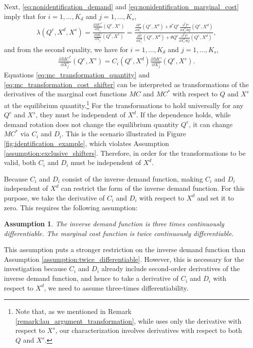 \documentclass[11pt, a4paper]{article}
\newtheorem{assumption}{Assumption}
\theoremstyle{remark}
\begin{document}
Next, \eqref{eq:nonidentification_demand} and \eqref{eq:nonidentification_marginal_cost} imply that for $i = 1, \ldots, K_d$ and $j = 1, \ldots, K_s$,
\begin{align}
    \lambda(Q^e, X^{d}, X^{s}) =  \frac{\frac{\partial MC^{*}}{\partial X^{s}_j}(Q^e, X^{s})}{\frac{\partial MC}{\partial X^{s}_j}(Q^e, X^{s})} =  \frac{\frac{\partial P}{\partial X^{d}_i}(Q^e, X^{d}) + \theta^{*} Q^e\frac{\partial^2 P}{\partial X^{d}_{i}\partial Q}(Q^e, X^{d}) }{\frac{\partial P}{\partial X^{d}_i}(Q^e, X^{d}) + \theta Q^e\frac{\partial^2 P}{\partial X^{d}_{i}\partial Q}(Q^e, X^{d})},
\end{align}
and from the second equality, we have for $i = 1, \ldots, K_d$ and $j = 1, \ldots, K_s$,
\begin{align}
    \frac{\partial MC^{*}}{\partial X^{s}_j}(Q^e, X^{s}) = C_i(Q^e, X^{d})\frac{\partial MC}{\partial X^{s}_j}(Q^e, X^{s}).\label{eq:mc_transformation_cost_shifter}
\end{align}
Equations \eqref{eq:mc_transformation_quantity} and \eqref{eq:mc_transformation_cost_shifter}  can be interpreted as transformations of the derivatives of the marginal cost functions $MC$ and $MC^{*}$ with respect to $Q$ and $X^{s}$ at the equilibrium quantity.\footnote{Note that, as we mentioned in Remark \ref{remark:lau_argument_transformation}, while \citet{lau1982identifying} uses only the derivative with respect to $X^{s}$, our characterization involves derivatives with respect to both $Q$ and $X^{s}$.}
For the transformations to hold universally for any $Q^e$ and $X^{s}$, they must be independent of $X^{d}$.
If the dependence holds, while demand rotation does not change the equilibrium quantity $Q^e$, it can change $MC^{*}$ via $C_i$ and $D_i$.
This is the scenario illustrated in Figure \ref{fig:identification_example}, which violates Assumption \ref{assumption:exclusive_shifters}. 
Therefore, in order for the transformations to be valid, both $C_i$ and $D_i$ must be independent of $X^{d}$.

Because $C_i$ and $D_i$ consist of the inverse demand function, making $C_i$ and $D_i$ independent of $X^{d}$ can restrict the form of the inverse demand function.
For this purpose, we take the derivative of $C_i$ and $D_i$ with respect to $X^{d}$ and set it to zero.
This requires the following assumption:
\begin{assumption}\label{assumption:three_times_differentiable}
    The inverse demand function is three times continuously differentiable.
    The marginal cost function is twice continuously differentiable.
\end{assumption}
This assumption puts a stronger restriction on the inverse demand function than Assumption \ref{assumption:twice_differentiable}.
However, this is necessary for the investigation because $C_i$ and $D_i$ already include second-order derivatives of the inverse demand function, and hence to take a derivative of $C_i$ and $D_i$ with respect to $X^{d}$, we need to assume three-times differentiability.
\end{document}
